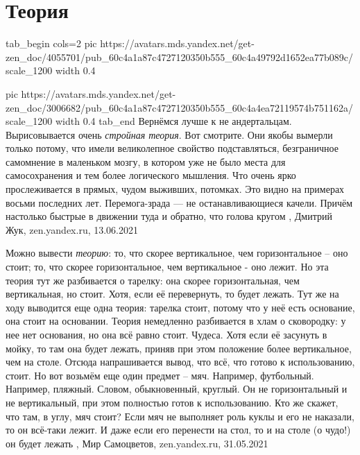  
 
 
 
 
\chapter{Теория}
\label{sec:slova.teoria}

\ifcmt
tab_begin cols=2
  pic https://avatars.mds.yandex.net/get-zen_doc/4055701/pub_60c4a1a87c4727120350b555_60c4a49792d1652ea77b089c/scale_1200
	width 0.4

	pic https://avatars.mds.yandex.net/get-zen_doc/3006682/pub_60c4a1a87c4727120350b555_60c4a4ea72119574b751162a/scale_1200
	width 0.4
tab_end
\fi
Вернёмся лучше к не андертальцам. Вырисовывается очень \emph{стройная теория}.
Вот смотрите. Они якобы вымерли только потому, что имели великолепное свойство
подставляться, безграничное самомнение в маленьком мозгу, в котором уже не было
места для самосохранения и тем более логического мышления. Что очень ярко
прослеживается в прямых, чудом выживших, потомках. Это видно на примерах восьми
последних лет. Перемога-зрада — не останавливающиеся качели. Причём настолько
быстрые в движении туда и обратно, что голова кругом
, 
Дмитрий Жук, zen.yandex.ru, 13.06.2021 

Можно вывести \emph{теорию}: то, что скорее вертикальное, чем горизонтальное –
оно стоит; то, что скорее горизонтальное, чем вертикальное - оно лежит. Но эта
теория тут же разбивается о тарелку: она скорее горизонтальная, чем
вертикальная, но стоит. Хотя, если её перевернуть, то будет лежать.  Тут же на
ходу выводится еще одна теория: тарелка стоит, потому что у неё есть основание,
она стоит на основании. Теория немедленно разбивается в хлам о сковородку: у
нее нет основания, но она всё равно стоит. Чудеса.  Хотя если её засунуть в
мойку, то там она будет лежать, приняв при этом положение более вертикальное,
чем на столе. Отсюда напрашивается вывод, что всё, что готово к использованию,
стоит.  Но вот возьмём еще один предмет – мяч. Например, футбольный. Например,
пляжный.  Словом, обыкновенный, круглый. Он не горизонтальный и не
вертикальный, при этом полностью готов к использованию. Кто же скажет, что там,
в углу, мяч стоит?  Если мяч не выполняет роль куклы и его не наказали, то он
всё-таки лежит. И даже если его перенести на стол, то и на столе (о чудо!) он
будет лежать
, Мир Самоцветов, zen.yandex.ru, 31.05.2021

